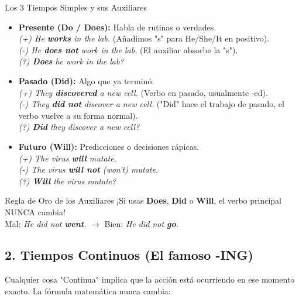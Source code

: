 \documentclass[11pt,a4paper]{article}
\begin{document}
\begin{hackbox}{Los 3 Tiempos Simples y sus Auxiliares}
    \begin{itemize}[noitemsep]
        \item \textbf{Presente (Do / Does):} Habla de rutinas o verdades. \\
        \textit{(+) He \textbf{works} in the lab.} (Añadimos "s" para He/She/It en positivo). \\
        \textit{(-) He \textbf{does not} work in the lab.} (El auxiliar absorbe la "s"). \\
        \textit{(?) \textbf{Does} he work in the lab?}
        
        \item \textbf{Pasado (Did):} Algo que ya terminó. \\
        \textit{(+) They \textbf{discovered} a new cell.} (Verbo en pasado, usualmente -ed). \\
        \textit{(-) They \textbf{did not} discover a new cell.} ("Did" hace el trabajo de pasado, el verbo vuelve a su forma normal). \\
        \textit{(?) \textbf{Did} they discover a new cell?}
        
        \item \textbf{Futuro (Will):} Predicciones o decisiones rápicas. \\
        \textit{(+) The virus \textbf{will} mutate.} \\
        \textit{(-) The virus \textbf{will not} (won't) mutate.} \\
        \textit{(?) \textbf{Will} the virus mutate?}
    \end{itemize}
\end{hackbox}

\begin{trapbox}{Regla de Oro de los Auxiliares}
    ¡Si usas \textbf{Does}, \textbf{Did} o \textbf{Will}, el verbo principal NUNCA cambia! \\
    Mal: \textit{He did not \textbf{went}.} $\to$ Bien: \textit{He did not \textbf{go}.}
\end{trapbox}

\subsection{2. Tiempos Continuos (El famoso -ING)}
Cualquier cosa "Continua" implica que la acción está ocurriendo en ese momento exacto. La fórmula matemática nunca cambia:
\end{document}
